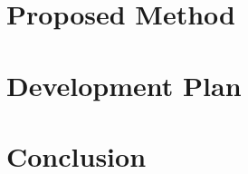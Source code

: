 \documentclass[10pt]{article}
\begin{document}
\section{Proposed Method}
\label{sec:method}


\section{Development Plan}
\label{sec:plan}


\section{Conclusion}
\label{sec:conclusion}




\end{document}
